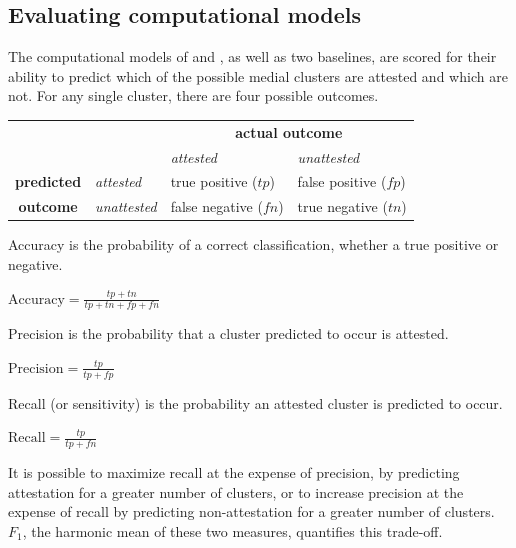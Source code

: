 \subsection{Evaluating computational models}

The computational models of \citeauthor{Pierrehumbert1994} and \citeauthor{Hayes2008a}, as well as two baselines, are scored for their ability to predict which of the possible medial clusters are attested and which are not. For any single cluster, there are four possible outcomes.

\begin{example}
\begin{tabular}{c l | l l}
                   & & \multicolumn{2}{c}{\textbf{actual outcome}}            \\
                   & & \emph{attested}   & \emph{unattested}            \\
\midrule
\textbf{predicted} & \emph{attested}   & true positive ($tp$)  & false positive ($fp$) \\
\textbf{outcome}   & \emph{unattested} & false negative ($fn$) & true negative ($tn$)  \\
\end{tabular}
\end{example}

\noindent Accuracy is the probability of a correct classification, whether a true positive or negative.

\begin{unlabeledexample}
$\displaystyle \textrm{Accuracy} = \frac{tp + tn}{tp + tn + fp + fn}$
\end{unlabeledexample}

\noindent Precision is the probability that a cluster predicted to occur is attested.

\begin{unlabeledexample}
$\displaystyle \textrm{Precision} = \frac{tp}{tp + fp}$
\end{unlabeledexample}

\noindent Recall (or sensitivity) is the probability an attested cluster is predicted to occur.

\begin{unlabeledexample}
$\displaystyle \textrm{Recall} = \frac{tp}{tp + fn}$
\end{unlabeledexample}

\noindent It is possible to maximize recall at the expense of precision, by predicting attestation for a greater number of clusters, or to increase precision at the expense of recall by predicting non-attestation for a greater number of clusters. $F_1$, the harmonic mean of these two measures, quantifies this trade-off.


